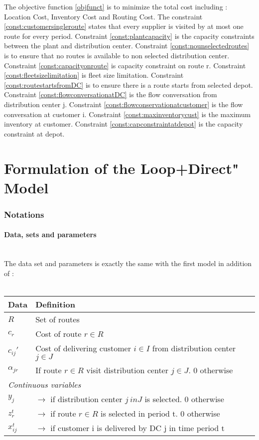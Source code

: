 \documentclass[12pt, a4paper]{article}
\begin{document}
The objective function \eqref{objfunct} is to minimize the total cost including : Location Cost, Inventory Cost and Routing Cost.
The constraint \eqref{const:customersingleroute} states that every supplier is visited by at most one route for every period. 
Constraint \eqref{const:plantcapacity} is the capacity constraints between the plant and distribution center.
Constraint \eqref{const:nounselectedroutes} is to ensure that no routes is available to non selected distribution center. 
Constraint \eqref{const:capacityonroute} is capacity constraint on route r.
Constraint \eqref{const:fleetsizelimitation} is fleet size limitation.
Constraint \eqref{const:routestartsfromDC} is to ensure there is a route starts from selected depot.
Constraint \eqref{const:flowconversationatDC} is the flow conversation from distribution center j.
Constraint \eqref{const:flowconservationatcustomer} is the flow conversation at customer i. 
Constraint \eqref{const:maxinventorycust} is the maximum inventory at customer.
Constraint \eqref{const:capconstraintatdepot} is the capacity constraint at depot.

\section{Formulation of the Loop+Direct" Model }


\subsubsection{Notations}\label{subsection:notations2}
\paragraph{Data, sets and parameters}~\\
The data set and parameters is exactly the same with the first model in addition of :
\\
\\
\begin{tabular}{ll}
\hline
Data & Definition \\
\hline
$R$ & Set of routes\\ 
$c_r$ & Cost of route $r\in R$\\ 
$c_{ij}'$ & Cost of delivering customer $i\in I$ from distribution center $j\in J$\\
$\alpha_{jr}$ & If route $r\in R$ visit distribution center $j\in J$. 0 otherwise\\
\hline
\multicolumn{2}{l}{\textit{Continuous variables}}\\
\hline
$y_j$ & $\rightarrow$ if distribution center $j\ in J$ is selected. 0 otherwise\\
$z^t_r$ & $\rightarrow$ if route $r\in R$ is selected in period t. 0 otherwise\\
$x^t_{ij}$ & $\rightarrow$ if customer i is delivered by DC j in time period t\\
\end{tabular}
\end{document}
